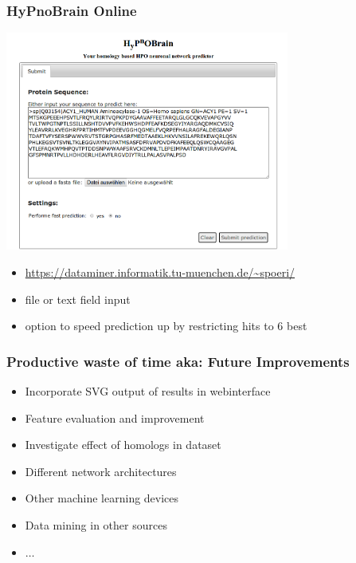 \documentclass{beamer}
\begin{document}

\begin{frame}[fragile]
	\frametitle{HyPnoBrain Online}
\begin{center}
\includegraphics[width=0.7\textwidth]{webinterface.png}
\end{center}

\begin{itemize}
	\item \url{https://dataminer.informatik.tu-muenchen.de/~spoeri/}
	\item file or text field input
	\item option to speed prediction up by restricting hits to 6 best
\end{itemize}

\end{frame}

\begin{frame}
	\frametitle{Productive waste of time aka: Future Improvements}
	\begin{itemize}
		\item Incorporate SVG output of results in webinterface
		\item Feature evaluation and improvement
		\item Investigate effect of homologs in dataset
		\item Different network architectures 
		\item Other machine learning devices
		\item Data mining in other sources
		\item $\dots$
	\end{itemize}		
	
\end{frame}
\end{document}

